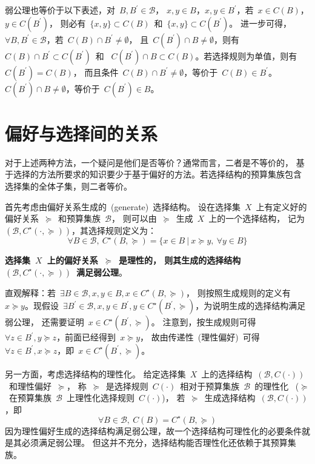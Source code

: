 \documentclass[a4paper,12pt]{article}
\begin{document}
弱公理也等价于以下表述，对~$B,B^\prime\in\mathcal{B}$，
$x,y\in B$，$x,y\in B^\prime$，若~$x\in C(B)$，$y\in C(B^\prime)$，
则必有~$\{x,y\}\subset C(B)$~和~$\{x,y\}\subset C(B^\prime)$。
进一步可得，$\forall B,B^\prime\in\mathcal{B}$，若~$C(B)\cap B^\prime\neq\emptyset$，
且~$C(B^\prime)\cap B\neq\emptyset$，则有~$C(B)\cap B^\prime\subset C(B^\prime)$~和~
$C(B^\prime)\cap B\subset C(B)$。若选择规则为单值，则有~$C(B^\prime)=C(B)$，
而且条件~$C(B)\cap B^\prime\neq\emptyset$，等价于~$C(B)\in B^\prime$。
~$C(B^\prime)\cap B\neq\emptyset$，等价于~$C(B^\prime)\in B$。


\section{偏好与选择间的关系}

对于上述两种方法，一个疑问是他们是否等价？通常而言，二者是不等价的，
基于选择的方法所要求的知识要少于基于偏好的方法。若选择结构的预算集族包含
选择集的全体子集，则二者等价。

首先考虑由偏好关系生成的~(generate)~选择结构。
设在选择集~$X$~上有定义好的偏好关系~$\succeq$~和预算集族~$\mathcal{B}$，
则可以由~$\succeq$~生成~$X$~上的一个选择结构，
记为~$(\mathcal{B},C^\star(\cdot,\succeq))$，其选择规则定义为：
\begin{equation*}
    \forall B\in\mathcal{B},~C^\star(B,\succeq)=\{x\in B \ | \ x\succeq y,~\forall y\in B\}
\end{equation*}

\textbf{选择集~$X$~上的偏好关系~$\succeq$~是理性的，
则其生成的选择结构~$(\mathcal{B},C^\star(\cdot,\succeq))$~满足弱公理}。

直观解释：若~$\exists B\in\mathcal{B}, x,y\in B, x\in C^\star(B,\succeq)$，
则按照生成规则的定义有~$x\succeq y$。现假设~$\exists B^\prime\in\mathcal{B},
x,y\in B^\prime, y\in C^\star(B^\prime,\succeq)$，为说明生成的选择结构满足弱公理，
还需要证明~$x\in C^\star(B^\prime,\succeq)$。
注意到，按生成规则可得~$\forall z\in B^\prime, y\succeq z$，前面已经得到~$x\succeq y$，
故由传递性~(理性偏好)~可得~$\forall z\in B^\prime, x\succeq z$，即~$x\in C^\star(B^\prime,\succeq)$。

另一方面，考虑选择结构的理性化。
给定选择集~$X$~上的选择结构~$(\mathcal{B},C(\cdot))$~和理性偏好~$\succeq$，
称~$\succeq$~是选择规则~$C(\cdot)$~相对于预算集族~$\mathcal{B}$~的理性化
~($\succeq$~在预算集族~$\mathcal{B}$~上理性化选择规则~$C(\cdot)$)，
若~$\succeq$~生成选择结构~$(\mathcal{B},C(\cdot))$，即
\begin{equation*}
    \forall B\in\mathcal{B},~C(B)=C^\star(B,\succeq)
\end{equation*}
因为理性偏好生成的选择结构满足弱公理，故一个选择结构可理性化的必要条件就是其必须满足弱公理。
但这并不充分，选择结构能否理性化还依赖于其预算集族。
\end{document}
